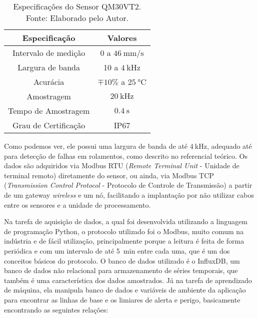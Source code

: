 \documentclass[a4paper]{ifacconf}
\begin{document}
\begin{table}[H]
  \caption{Especificações do Sensor QM30VT2\textsuperscript\textregistered. Fonte: Elaborado pelo Autor.}
  \label{tab:espec_sensor}
  \centering
  \begin{minipage}{.33\textwidth}
    \begin{tabular*}{\textwidth}{c|c}
      \hline
      Especificação            & Valores                                     \\ \hline
      \hline
      Intervalo de medição     &  0 a $\SI{46}{\milli\metre\per\second}$     \\
      Largura de banda         &  10 a $\SI{4}{\kilo\hertz}$                 \\ 
      Acurácia                 &  $\mp 10 \%$ a $\SI{25}{\celsius}$          \\
      Amostragem               &  $\SI{20}{\kilo\hertz}$                     \\
      Tempo de Amostragem      &  $\SI{0.4}{\second}$                        \\
      Grau de Certificação     &  IP67                                       \\ \hline
    \end{tabular*}
  \end{minipage}
\end{table}

Como podemos ver, ele possui uma largura de banda de até $\SI{4}{\kilo\hertz}$, adequado até para detecção de falhas em rolamentos, como 
descrito no referencial teórico. Os dados são adquiridos via Modbus RTU (\textit{Remote Terminal Unit} - Unidade de terminal remoto) diretamente
do sensor, ou ainda, via Modbus TCP (\textit{Transmission Control Protocol} - Protocolo de Controle de Transmissão) a partir de um gateway
\textit{wireless} e um nó, facilitando a implantação por não utilizar cabos entre os sensores e a unidade de processamento. 

Na tarefa de aquisição de dados, a qual foi desenvolvida utilizando a linguagem de programação Python, o protocolo utilizado foi o Modbus, 
muito comum na indústria e de fácil utilização, principalmente porque a leitura é feita de forma periódica e com um intervalo de até 
\SI{5}{\minute} entre cada uma, que é um dos conceitos básicos do protocolo. O banco de dados utilizado é o InfluxDB, um banco de dados não 
relacional para armazenamento de séries temporais, que também é uma característica dos dados amostrados.
Já na tarefa de aprendizado de máquina, ela  manipula banco de dados e variáveis de ambiente da aplicação para encontrar as linhas de base e
os limiares de alerta e perigo, basicamente encontrando as seguintes relações:
\end{document}
